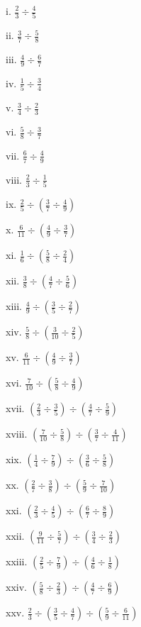 \documentclass[]{book}
\begin{document}
\begin{multicols}{2}
 
    i. $\frac{2}{3} \div \frac{4}{5}$
 
    ii. $\frac{3}{7} \div \frac{5}{8}$
 
    iii. $\frac{4}{9} \div \frac{6}{7}$
 
    iv. $\frac{1}{5} \div \frac{3}{4}$
 
    v. $\frac{3}{4} \div \frac{2}{3}$
 
    vi. $\frac{5}{8} \div \frac{3}{7}$
 
    vii. $\frac{6}{7} \div \frac{4}{9}$
 
    viii. $\frac{2}{3} \div \frac{1}{5}$
 
    ix. $\frac{2}{5} \div (\frac{3}{7} \div \frac{4}{9})$
 
    x. $\frac{6}{11} \div (\frac{4}{9} \div \frac{3}{7})$
 
    xi. $\frac{1}{6} \div (\frac{5}{8} \div \frac{2}{4})$
 
    xii. $\frac{3}{8} \div (\frac{4}{7} \div \frac{5}{6})$
 
    xiii. $\frac{4}{9} \div (\frac{3}{5} \div \frac{2}{7})$
 
    xiv. $\frac{5}{8} \div (\frac{3}{10} \div \frac{2}{5})$
 
    xv. $\frac{6}{11} \div (\frac{4}{9} \div \frac{3}{7})$
 
    xvi. $\frac{7}{10} \div (\frac{5}{8} \div \frac{4}{9})$
 
    xvii. $(\frac{2}{3} \div \frac{3}{5}) \div (\frac{4}{7} \div \frac{5}{9})$
 
    xviii. $(\frac{7}{10} \div \frac{5}{8}) \div (\frac{3}{7} \div \frac{4}{11})$
 
    xix. $(\frac{1}{4} \div \frac{7}{9}) \div (\frac{3}{6} \div \frac{5}{8})$
 
    xx. $(\frac{2}{7} \div \frac{3}{8}) \div (\frac{5}{9} \div \frac{7}{10})$
 
    xxi. $(\frac{2}{3} \div \frac{4}{5}) \div (\frac{6}{7} \div \frac{8}{9})$
 
    xxii. $(\frac{9}{11} \div \frac{5}{7}) \div (\frac{3}{4} \div \frac{2}{3})$
 
    xxiii. $(\frac{2}{5} \div \frac{7}{9}) \div (\frac{4}{6} \div \frac{1}{8})$
 
    xxiv. $(\frac{5}{8} \div \frac{2}{3}) \div (\frac{4}{7} \div \frac{6}{9})$
 
    xxv. $\frac{2}{3} \div (\frac{3}{5} \div \frac{4}{7}) \div (\frac{5}{9} \div \frac{6}{11})$
 

\end{multicols}
\end{document}

